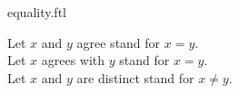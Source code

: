 \documentclass{article}
\begin{document}
\begin{smodule}[creators={Marcel Schütz}]{equality.ftl}

  \begin{fconvention*}
    Let $x$ and $y$ agree stand for $x = y$.\\
    Let $x$ agrees with $y$ stand for $x = y$.\\
    Let $x$ and $y$ are distinct stand for $x \neq y$.
  \end{fconvention*}
\end{smodule}
\end{document}
